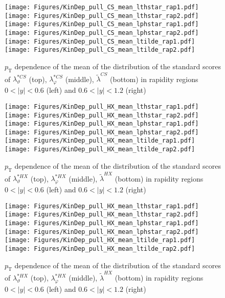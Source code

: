 \documentclass[12pt]{article}
\newcommand{\pT}{p_\mathrm{T}}
\newcommand{\absy}{\left |  y \right |}
\newcommand{\lamtildeCS}{\tilde{\lambda}^{\scriptscriptstyle CS}}
\newcommand{\lamthstarCS}{\lambda^{* \scriptscriptstyle CS}_\vartheta}
\newcommand{\lamphstarCS}{\lambda^{* \scriptscriptstyle CS}_\varphi}
\newcommand{\lamtildeHX}{\tilde{\lambda}^{\scriptscriptstyle HX}}
\newcommand{\lamthstarHX}{\lambda^{* \scriptscriptstyle HX}_\vartheta}
\newcommand{\lamphstarHX}{\lambda^{* \scriptscriptstyle HX}_\varphi}
\begin{document}
\begin{figure}[htbp]
\centering
\texttt{[image: Figures/KinDep\_pull\_CS\_mean\_lthstar\_rap1.pdf]}
\texttt{[image: Figures/KinDep\_pull\_CS\_mean\_lthstar\_rap2.pdf]}
\texttt{[image: Figures/KinDep\_pull\_CS\_mean\_lphstar\_rap1.pdf]}
\texttt{[image: Figures/KinDep\_pull\_CS\_mean\_lphstar\_rap2.pdf]}
\texttt{[image: Figures/KinDep\_pull\_CS\_mean\_ltilde\_rap1.pdf]}
\texttt{[image: Figures/KinDep\_pull\_CS\_mean\_ltilde\_rap2.pdf]}
\caption{$\pT$ dependence of the mean of the distribution of the standard scores
of $\lamthstarCS$ (top), $\lamphstarCS$ (middle), $\lamtildeCS$ (bottom) in
rapidity regions $0<\absy<0.6$ (left) and $0.6<\absy<1.2$ (right)}
\end{figure}
\clearpage




\begin{figure}[htbp]
\centering
\texttt{[image: Figures/KinDep\_pull\_HX\_mean\_lthstar\_rap1.pdf]}
\texttt{[image: Figures/KinDep\_pull\_HX\_mean\_lthstar\_rap2.pdf]}
\texttt{[image: Figures/KinDep\_pull\_HX\_mean\_lphstar\_rap1.pdf]}
\texttt{[image: Figures/KinDep\_pull\_HX\_mean\_lphstar\_rap2.pdf]}
\texttt{[image: Figures/KinDep\_pull\_HX\_mean\_ltilde\_rap1.pdf]}
\texttt{[image: Figures/KinDep\_pull\_HX\_mean\_ltilde\_rap2.pdf]}
\caption{$\pT$ dependence of the mean of the distribution of the standard scores
of $\lamthstarHX$ (top), $\lamphstarHX$ (middle), $\lamtildeHX$ (bottom) in
rapidity regions $0<\absy<0.6$ (left) and $0.6<\absy<1.2$ (right)}
\end{figure}
\clearpage


\begin{figure}[htbp]
\centering
\texttt{[image: Figures/KinDep\_pull\_HX\_mean\_lthstar\_rap1.pdf]}
\texttt{[image: Figures/KinDep\_pull\_HX\_mean\_lthstar\_rap2.pdf]}
\texttt{[image: Figures/KinDep\_pull\_HX\_mean\_lphstar\_rap1.pdf]}
\texttt{[image: Figures/KinDep\_pull\_HX\_mean\_lphstar\_rap2.pdf]}
\texttt{[image: Figures/KinDep\_pull\_HX\_mean\_ltilde\_rap1.pdf]}
\texttt{[image: Figures/KinDep\_pull\_HX\_mean\_ltilde\_rap2.pdf]}
\caption{$\pT$ dependence of the mean of the distribution of the standard scores
of $\lamthstarHX$ (top), $\lamphstarHX$ (middle), $\lamtildeHX$ (bottom) in
rapidity regions $0<\absy<0.6$ (left) and $0.6<\absy<1.2$ (right)}
\end{figure}
\clearpage
\end{document}
